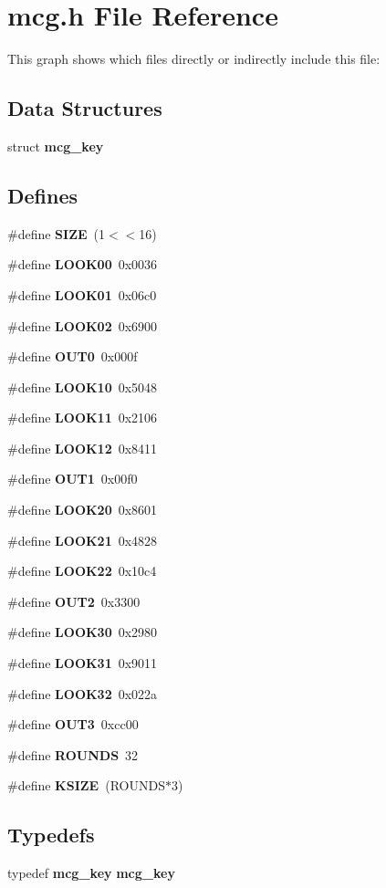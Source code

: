 \section{mcg.h File Reference}
\label{mcg_8h}




This graph shows which files directly or indirectly include this file:\subsection*{Data Structures}
\begin{CompactItemize}
\item 
struct {\bf mcg\_\-key}
\end{CompactItemize}
\subsection*{Defines}
\begin{CompactItemize}
\item 
\#define {\bf SIZE}\ (1$<$$<$16)
\item 
\#define {\bf LOOK00}\ 0x0036
\item 
\#define {\bf LOOK01}\ 0x06c0
\item 
\#define {\bf LOOK02}\ 0x6900
\item 
\#define {\bf OUT0}\ 0x000f
\item 
\#define {\bf LOOK10}\ 0x5048
\item 
\#define {\bf LOOK11}\ 0x2106
\item 
\#define {\bf LOOK12}\ 0x8411
\item 
\#define {\bf OUT1}\ 0x00f0
\item 
\#define {\bf LOOK20}\ 0x8601
\item 
\#define {\bf LOOK21}\ 0x4828
\item 
\#define {\bf LOOK22}\ 0x10c4
\item 
\#define {\bf OUT2}\ 0x3300
\item 
\#define {\bf LOOK30}\ 0x2980
\item 
\#define {\bf LOOK31}\ 0x9011
\item 
\#define {\bf LOOK32}\ 0x022a
\item 
\#define {\bf OUT3}\ 0xcc00
\item 
\#define {\bf ROUNDS}\ 32
\item 
\#define {\bf KSIZE}\ (ROUNDS$\ast$3)
\end{CompactItemize}
\subsection*{Typedefs}
\begin{CompactItemize}
\item 
typedef {\bf mcg\_\-key} {\bf mcg\_\-key}
\end{CompactItemize}
